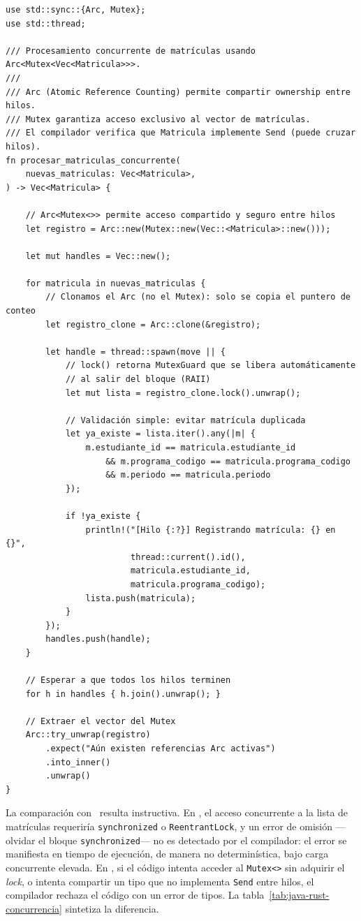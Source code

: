 \begin{lstlisting}[style=rustStyle, caption={caption[Acceso concurrente con Arc y Mutex]{Acceso concurrente con \texttt{Arc$<$Mutex$>$}}}, label={lst:concurrencia}]
use std::sync::{Arc, Mutex};
use std::thread;

/// Procesamiento concurrente de matrículas usando Arc<Mutex<Vec<Matricula>>>.
///
/// Arc (Atomic Reference Counting) permite compartir ownership entre hilos.
/// Mutex garantiza acceso exclusivo al vector de matrículas.
/// El compilador verifica que Matricula implemente Send (puede cruzar hilos).
fn procesar_matriculas_concurrente(
    nuevas_matriculas: Vec<Matricula>,
) -> Vec<Matricula> {

    // Arc<Mutex<>> permite acceso compartido y seguro entre hilos
    let registro = Arc::new(Mutex::new(Vec::<Matricula>::new()));

    let mut handles = Vec::new();

    for matricula in nuevas_matriculas {
        // Clonamos el Arc (no el Mutex): solo se copia el puntero de conteo
        let registro_clone = Arc::clone(&registro);

        let handle = thread::spawn(move || {
            // lock() retorna MutexGuard que se libera automáticamente
            // al salir del bloque (RAII)
            let mut lista = registro_clone.lock().unwrap();

            // Validación simple: evitar matrícula duplicada
            let ya_existe = lista.iter().any(|m| {
                m.estudiante_id == matricula.estudiante_id
                    && m.programa_codigo == matricula.programa_codigo
                    && m.periodo == matricula.periodo
            });

            if !ya_existe {
                println!("[Hilo {:?}] Registrando matrícula: {} en {}",
                         thread::current().id(),
                         matricula.estudiante_id,
                         matricula.programa_codigo);
                lista.push(matricula);
            }
        });
        handles.push(handle);
    }

    // Esperar a que todos los hilos terminen
    for h in handles { h.join().unwrap(); }

    // Extraer el vector del Mutex
    Arc::try_unwrap(registro)
        .expect("Aún existen referencias Arc activas")
        .into_inner()
        .unwrap()
}
\end{lstlisting}

\noindent
La comparación con \java\ resulta instructiva. En \java, el acceso concurrente a la
lista de matrículas requeriría \texttt{synchronized} o \texttt{ReentrantLock}, y un
error de omisión ---olvidar el bloque \texttt{synchronized}--- no es detectado por el
compilador: el error se manifiesta en tiempo de ejecución, de manera no determinística,
bajo carga concurrente elevada. En \rust, si el código intenta acceder al
\texttt{Mutex<>} sin adquirir el \textit{lock}, o intenta compartir un tipo que
no implementa \texttt{Send} entre hilos, el compilador rechaza el código con un
error de tipos. La tabla~\ref{tab:java-rust-concurrencia} sintetiza la diferencia.

